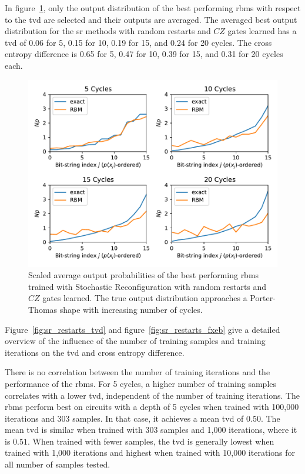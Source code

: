 In figure~\ref{fig:sr_restarts_bestPDF}, only the output distribution of the best performing \gls{rbm}s with respect to the 
\gls{tvd} are selected and their outputs are averaged. The averaged best output distribution for the \gls{sr} methods with 
random restarts and $CZ$ gates learned has a \gls{tvd} of 0.06 for 5, 0.15 for 10, 0.19 for 15, and 0.24 for 20
cycles. The cross entropy difference is 0.65 for 5, 0.47 for 10, 0.39 for 15, and 0.31 for 20 cycles each. 

\begin{figure}[H]
  \centering
  \includegraphics[width=\textwidth]{figures/results/sr-restarts-learned/avgBestPDF.pdf}
  \caption[Scaled Average Output Probabilities of Best Performing RBMs Trained with Stochastic Reconfiguration with Random Restarts and $CZ$ Gates Learned]{
    Scaled average output probabilities of the best performing \gls{rbm}s trained with Stochastic Reconfiguration with random restarts and $CZ$ gates learned. The true 
    output distribution approaches a Porter-Thomas shape with increasing number of cycles.}
  \label{fig:sr_restarts_bestPDF} 
\end{figure}

Figure~\ref{fig:sr_restarts_tvd} and figure~\ref{fig:sr_restarts_fxeb} give a detailed overview of the influence of the 
number of training samples and training iterations on the \gls{tvd} and cross entropy difference. 

There is no correlation between the number of training
iterations and the performance of the \gls{rbm}s. For 5 cycles, a higher number of training samples correlates
with a lower \gls{tvd}, independent of the number of training iterations. The \gls{rbm}s perform best on 
circuits with a depth of 5 cycles when trained with 100,000 iterations and 303 samples. In that case, 
it achieves a mean \gls{tvd} of $0.50$. The mean \gls{tvd} is similar when trained with 303 samples and 1,000 iterations, 
where it is $0.51$. When trained with fewer samples, the \gls{tvd} is generally lowest when trained with 1,000 
iterations and highest when trained with 10,000 iterations for all number of samples tested. 


